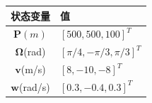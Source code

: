 \begin{table}[htp]
    \centering
    \vspace{0.5em}
    \begin{tabular}{cl}
        \toprule
        状态变量&值  \\
        \midrule
        $\mathbf{P}(m)$&$[500,500,100]^T$  \\
        $\mathbf{\Omega}$(rad)&$[\pi/4,-\pi/3,\pi/3]^T$  \\
        $\mathbf{v}$(m/s)&$[8,-10,-8]^T$  \\
        $\mathbf{w}$(rad/s)&$[0.3,-0.4,0.3]^T$\\
        \bottomrule
    \end{tabular}    
\end{table}

